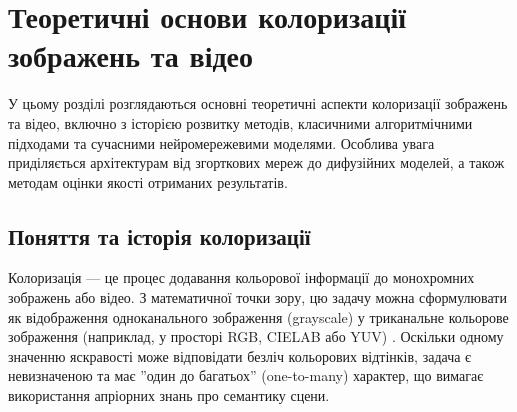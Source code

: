 \chapter{Теоретичні основи колоризації зображень та відео}
\label{chap:review}

    У цьому розділі розглядаються основні теоретичні аспекти колоризації зображень та відео, включно з історією розвитку методів, класичними алгоритмічними підходами та сучасними нейромережевими моделями.
    Особлива увага приділяється архітектурам від згорткових мереж до дифузійних моделей, а також методам оцінки якості отриманих результатів.
\section{Поняття та історія колоризації}


    Колоризація — це процес додавання кольорової інформації до монохромних зображень або відео.
    З математичної точки зору, цю задачу можна сформулювати як відображення одноканального зображення (grayscale) у триканальне кольорове зображення (наприклад, у просторі RGB, CIELAB або YUV) \cite{2025-survey}.
    Оскільки одному значенню яскравості може відповідати безліч кольорових відтінків, задача є невизначеною та має ''один до багатьох'' (one-to-many) характер, що вимагає використання апріорних знань про семантику сцени.

